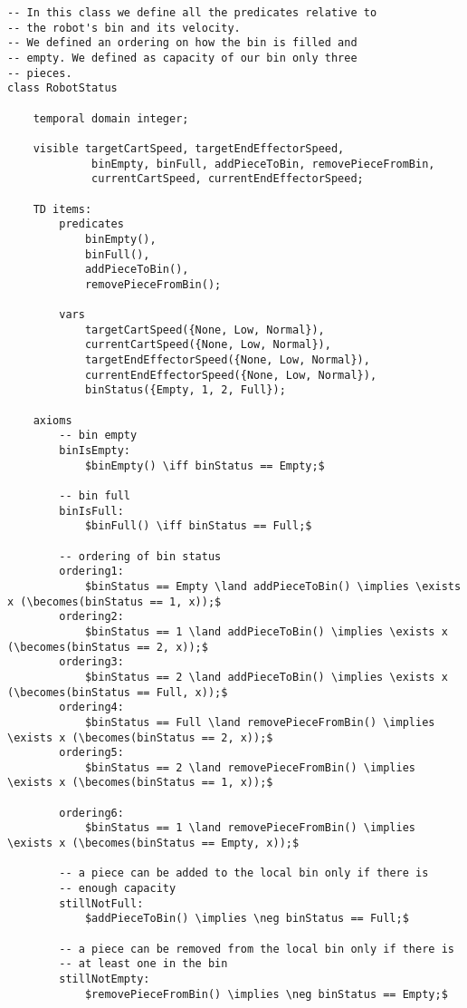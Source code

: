 \begin{lstlisting}[fontadjust, mathescape, frame=single] 
-- In this class we define all the predicates relative to
-- the robot's bin and its velocity.
-- We defined an ordering on how the bin is filled and 
-- empty. We defined as capacity of our bin only three
-- pieces.
class RobotStatus

    temporal domain integer;

    visible targetCartSpeed, targetEndEffectorSpeed, 
             binEmpty, binFull, addPieceToBin, removePieceFromBin,
             currentCartSpeed, currentEndEffectorSpeed;

    TD items:
        predicates
            binEmpty(),
            binFull(),
            addPieceToBin(),
            removePieceFromBin();

        vars
            targetCartSpeed({None, Low, Normal}),
            currentCartSpeed({None, Low, Normal}),
            targetEndEffectorSpeed({None, Low, Normal}),
            currentEndEffectorSpeed({None, Low, Normal}),
            binStatus({Empty, 1, 2, Full});

    axioms
        -- bin empty
        binIsEmpty:
            $binEmpty() \iff binStatus == Empty;$

        -- bin full
        binIsFull:
            $binFull() \iff binStatus == Full;$

        -- ordering of bin status
        ordering1:
            $binStatus == Empty \land addPieceToBin() \implies \exists x (\becomes(binStatus == 1, x));$
        ordering2:
            $binStatus == 1 \land addPieceToBin() \implies \exists x (\becomes(binStatus == 2, x));$
        ordering3:
            $binStatus == 2 \land addPieceToBin() \implies \exists x (\becomes(binStatus == Full, x));$
        ordering4:
            $binStatus == Full \land removePieceFromBin() \implies \exists x (\becomes(binStatus == 2, x));$
        ordering5:
            $binStatus == 2 \land removePieceFromBin() \implies \exists x (\becomes(binStatus == 1, x));$

        ordering6:
            $binStatus == 1 \land removePieceFromBin() \implies \exists x (\becomes(binStatus == Empty, x));$

        -- a piece can be added to the local bin only if there is 
        -- enough capacity
        stillNotFull:
            $addPieceToBin() \implies \neg binStatus == Full;$

        -- a piece can be removed from the local bin only if there is
        -- at least one in the bin
        stillNotEmpty:
            $removePieceFromBin() \implies \neg binStatus == Empty;$


\end{lstlisting}
